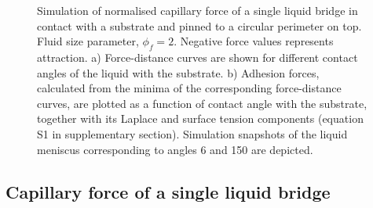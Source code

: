 \documentclass[vruler,JEB]{COB}%
\begin{document}
\begin{figure}[!t]
\centering
{}%
\hskip3pc
%
\caption[]{Simulation of normalised capillary force of a single liquid
bridge in contact with a substrate and pinned to a circular perimeter
on top. Fluid size parameter, $\phi_{f}=2$. Negative force values
represents attraction. a) Force-distance curves are shown for different
contact angles of the liquid with the substrate. b) Adhesion forces,
calculated from the minima of the corresponding force-distance curves,
are plotted as a function of contact angle with the substrate, together
with its Laplace and surface tension components (equation S1 in supplementary section).
Simulation snapshots of the liquid meniscus corresponding to angles
6\textdegree{} and 150\textdegree{} are depicted.}
\label{fig:Single-bridge}
\end{figure}

\subsection{Capillary force of a single liquid bridge\label{subsec:Capillary-force-of}}
\end{document}
